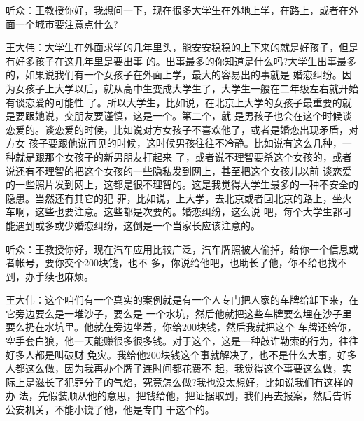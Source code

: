 \documentclass[11pt,a4paper,onecolumn]{article}
\begin{document}
听众：王教授你好，我想问一下，现在很多大学生在外地上学，在路上，或者在外面一个城市要注意点什么?

王大伟：大学生在外面求学的几年里头，能安安稳稳的上下来的就是好孩子，但是有好多孩子在这几年里是要出事
的。出事最多的你知道是什么吗?大学生出事最多的，如果说我们有一个女孩子在外面上学，最大的容易出的事就是
婚恋纠纷。因为女孩子上大学以后，就从高中生变成大学生了，大学生一般在二年级左右就开始有谈恋爱的可能性
了。所以大学生，比如说，在北京上大学的女孩子最重要的就是要跟她说，交朋友要谨慎，这是一个。第二个，就
是男孩子也会在这个时候谈恋爱的。谈恋爱的时候，比如说对方女孩子不喜欢他了，或者是婚恋出现矛盾，对方女
孩子要跟他说再见的时候，这时候男孩往往不冷静。比如说有这么几种，一种就是跟那个女孩子的新男朋友打起来
了，或者说不理智要杀这个女孩的，或者说还有不理智的把这个女孩的一些隐私发到网上，甚至把这个女孩儿以前
谈恋爱的一些照片发到网上，这都是很不理智的。这是我觉得大学生最多的一种不安全的隐患。当然还有其它的犯
罪，比如说，上大学，去北京或者回北京的路上，坐火车啊，这些也要注意。这些都是次要的。婚恋纠纷，这么说
吧，每个大学生都可能遇到或多或少婚恋纠纷，这倒是一个当家长应该注意的。

听众：王教授你好，现在汽车应用比较广泛，汽车牌照被人偷掉，给你一个信息或者帐号，要你交个200块钱，也不
多，你说给他吧，也助长了他，你不给也找不到，办手续也麻烦。

王大伟：这个咱们有一个真实的案例就是有一个人专门把人家的车牌给卸下来，在它旁边要么是一堆沙子，要么是
一个水坑，然后他就把这些车牌要么埋在沙子里要么扔在水坑里。他就在旁边坐着，你给200块钱，然后我就把这个
车牌还给你，空手套白狼，他一天能赚很多很多钱。对于这个，这是一种敲诈勒索的行为，往往好多人都是叫破财
免灾。我给他200块钱这个事就解决了，也不是什么大事，好多人都这么做，因为我再办个牌子连时间都花费不
起，我觉得这个事要这么做，实际上是滋长了犯罪分子的气焰，究竟怎么做?我也没太想好，比如说我们有这样的办
法，先假装顺从他的意思，把钱给他，把证据取到，我们再去报案，然后告诉公安机关，不能小饶了他，他是专门
干这个的。
\end{document}

